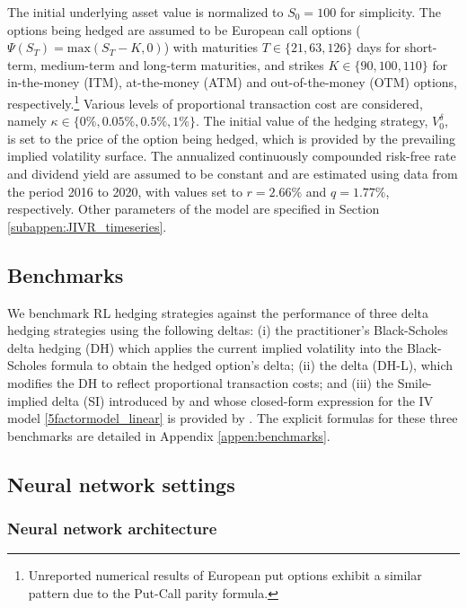 \documentclass[12pt]{article}
\begin{document}
The initial underlying asset value is normalized to $S_0=100$ for simplicity. The options being hedged are assumed to be European call options ($\Psi(S_T)=\mbox{max}(S_T-K,0)$) with maturities $T\in \{21,63,126 \}$ days for short-term, medium-term and long-term maturities, and strikes $K\in \{90,100,110 \}$ for in-the-money (ITM), at-the-money (ATM) and out-of-the-money (OTM) options, respectively.\footnote{Unreported numerical results of European put options exhibit a similar pattern due to the Put-Call parity formula.}
Various levels of proportional transaction cost are considered, namely $\kappa \in \{ 0\%,0.05\%,0.5\%,1\% \}$. The initial value of the hedging strategy, $V_{0}^{\delta}$, is set to the price of the option being hedged, which is provided by the prevailing implied volatility surface.
The annualized continuously compounded risk-free rate and dividend yield are assumed to be constant and are estimated using data from the period 2016 to 2020, with values set to $r=2.66\%$ and $q=1.77\%$, respectively.
Other parameters of the model are specified in Section \ref{subappen:JIVR_timeseries}.




\subsection{Benchmarks}\label{subse:benchmarks}

We benchmark RL hedging strategies against the performance of three delta hedging strategies using the following deltas: (i) the practitioner's Black-Scholes delta hedging (DH) which applies the current implied volatility into the Black-Scholes formula to obtain the hedged option's delta; (ii)  the \cite{Leland} delta (DH-L),
which modifies the DH to reflect proportional transaction costs; and (iii) the Smile-implied delta (SI) introduced by \cite{BATES2005195} and whose closed-form expression for the IV model \eqref{5factormodel_linear} is provided by \cite{Frnacois2022}. The explicit formulas for these three benchmarks are detailed in Appendix \ref{appen:benchmarks}.

\subsection{Neural network settings}\label{sbse:fine-tuning}

\subsubsection{Neural network architecture}\label{subsub:network_architecture}
\end{document}
